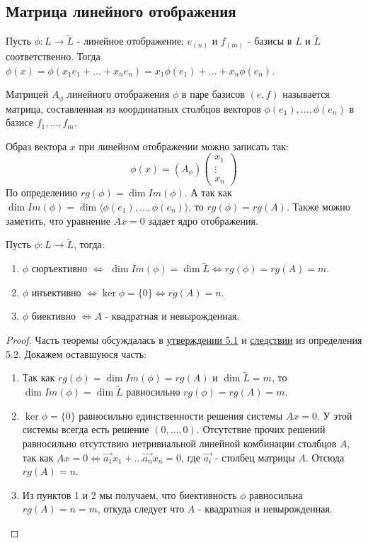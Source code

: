 \subsection{Матрица линейного отображения}
Пусть $\phi:L \to \tilde{L}$ - линейное отображение; $e_{(n)}$ и $f_{(m)}$ - базисы в $L$ и $\tilde{L}$ соответственно.
Тогда $\phi(x)=\phi(x_1 e_1+\dots+x_n e_n)=x_1\phi(e_1)+\dots+x_n\phi(e_n)$.
\begin{definition}
    Матрицей $A_{\phi}$ линейного отображения $\phi$ в паре базисов $(e, f)$ называется матрица, составленная из координатных столбцов векторов $\phi(e_1), \dots, \phi(e_n)$ в базисе $f_1, \dots, f_m$.
\end{definition}
Образ вектора $x$ при линейном отображении можно записать так:
\[
\phi(x)=\left( A_{\phi}\right)\begin{pmatrix} x_1 \\ \vdots \\ x_n \end{pmatrix}
\]
По определению $rg(\phi)=\dim Im(\phi)$. А так как $\dim Im(\phi)=\dim \langle \phi(e_1), \dots, \phi(e_n) \rangle$, то $rg(\phi)=rg(A)$. Также можно заметить, что уравнение $Ax=0$ задает ядро отображения.
\begin{theorem}\label{theor} Пусть $\phi:L \to \tilde{L}$, тогда:
    \begin{enumerate}
        \item $\phi$ сюръективно $\Leftrightarrow$ $\dim Im(\phi)=\dim \tilde{L} \Leftrightarrow rg(\phi)=rg(A)=m$.
        \item $\phi$ инъективно $\Leftrightarrow \ker \phi = \{0\} \Leftrightarrow rg(A)=n$.
        \item $\phi$ биективно $\Leftrightarrow A$ - квадратная и невырожденная.
    \end{enumerate}
\end{theorem}
\begin{proof}
    Часть теоремы обсуждалась в \hyperref[prop]{утверждении 5.1} и \hyperref[conseq]{следствии} из определения 5.2. Докажем оставшуюся часть:
    \begin{enumerate}
        \item Так как $rg(\phi)=\dim Im(\phi) = rg(A)$ и $\dim \tilde{L} =m$, то $\dim Im(\phi)=\dim \tilde{L}$ равносильно $rg(\phi)=rg(A)=m$.
        \item $\ker \phi = \{0\}$ равносильно единственности решения системы $Ax=0$. У этой системы всегда есть решение $(0, \dots, 0)$. Отсутствие прочих решений равносильно отсутствию нетривиальной линейной комбинации столбцов $A$, так как $Ax=0 \Leftrightarrow \vec{a_1}x_1+\dots \vec{a_n}x_n=0$, где $\vec{a_i}$ - столбец матрицы $A$. Отсюда $rg(A)=n$.
        \item Из пунктов 1 и 2 мы получаем, что биективность $\phi$ равносильна $rg(A)=n=m$, откуда следует что $A$ - квадратная и невырожденная.
    \end{enumerate}
\end{proof}
